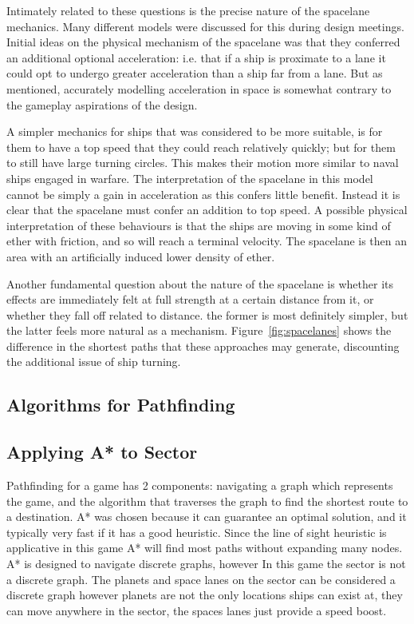 Intimately related to these questions is the precise nature of the spacelane mechanics. Many different models were discussed for this during design meetings. Initial ideas on the physical mechanism of the spacelane was that they conferred an additional optional acceleration: i.e. that if a ship is proximate to a lane it could opt to undergo greater acceleration than a ship far from a lane. But as mentioned, accurately modelling acceleration in space is somewhat contrary to the gameplay aspirations of the design. 

A simpler mechanics for ships that was considered to be more suitable, is for them to have a top speed that they could reach relatively quickly; but for them to still have large turning circles. This makes their motion more similar to naval ships engaged in warfare. The interpretation of the spacelane in this model cannot be simply a gain in acceleration as this confers little benefit. Instead it is clear that the spacelane must confer an addition to top speed. A possible physical interpretation of these behaviours is that the ships are moving in some kind of ether with friction, and so will reach a terminal velocity. The spacelane is then an area with an  artificially induced lower density of ether.

Another fundamental question about the nature of the spacelane is whether its effects are immediately felt at full strength at a certain distance from it, or whether they fall off related to distance. the former is most definitely simpler, but the latter feels more natural as a mechanism. Figure~\ref{fig:spacelanes} shows the difference in the shortest paths that these approaches may generate, discounting the additional issue of ship turning.

\subsection{Algorithms for Pathfinding}

\subsection{Applying A* to Sector}
Pathfinding for a game has 2 components: navigating a graph which represents the game, and the algorithm that traverses the graph to find the shortest route to a destination.
A* was chosen because it can guarantee an optimal solution, and it typically very fast if it has a good heuristic. 
Since the line of sight heuristic is applicative in this game A* will find most paths without expanding many nodes.
A* is designed to navigate discrete graphs, however In this game the sector is not a discrete graph.
The planets and space lanes on the sector can be considered a discrete graph however planets are not the only locations ships can exist at, they can move anywhere in the sector, the spaces lanes just provide a speed boost.

